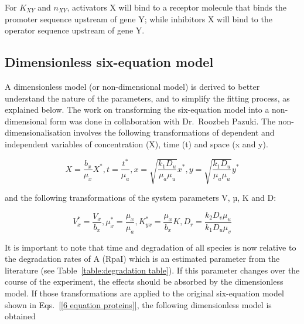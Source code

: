 For $K_{XY}$ and $n_{XY}$,
activators X will bind to a receptor molecule that binds the promoter sequence upstream of gene Y;
while inhibitors X will bind to the operator sequence upstream of gene Y.



\subsection{Dimensionless six-equation model}

A dimensionless model (or non-dimensional model) is derived to better understand the nature of the parameters,
and to simplify the fitting process, as explained below.
The work on transforming the six-equation model into a non-dimensional form was done in collaboration with Dr.~Roozbeh Pazuki.
The non-dimensionalisation involves the following transformations of dependent and independent variables of concentration
(X),
time (t) and space
(x and y).


\begin{equation}\label{variable transformations}
    X = \frac{b_{x}}{\mu_{x}}X^*, t = \frac{t^*}{\mu_{a}},
    x = \sqrt{\frac{k_{1}D_{u}}{\mu_{a}\mu_{u}}}x^*, y = \sqrt{\frac{k_{1}D_{u}}{\mu_{a}\mu_{u}}}y^*
\end{equation}

and the following transformations of the system parameters V, µ, K and D:

\begin{equation}\label{parameter transformations}
    V_{x}^*=\frac{V_{x}}{b_{x}},  \mu_{x}^* = \frac{\mu_{x}}{\mu_{a}},
K^*_{yx} = \frac{\mu_{x}}{b_{x}}K ,D_{r} = \frac{k_{2}D_{v}\mu_{u}}{k_{1}D_{u}\mu_{v}}
\end{equation}

It is important to note that time and degradation of all species is now relative to the degradation rates of A
(RpaI) which is an estimated parameter from the literature
(see Table~\ref{table:degradation table}).
If this parameter changes over the course of the experiment, the effects should be absorbed by the dimensionless model.
If those transformations are applied to the original six-equation model shown in Eqs.~\ref{[6 equation proteins]}, the following dimensionless model is obtained

